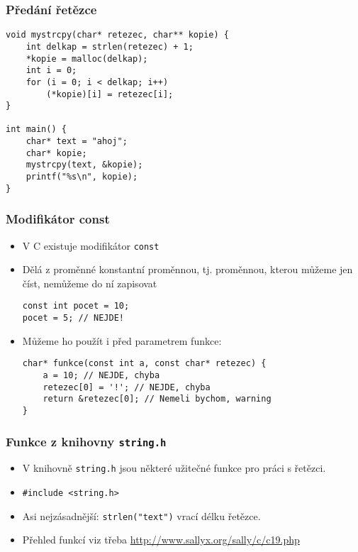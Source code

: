 \documentclass{beamer}
\newenvironment{itemizex}%
  {\large \begin{itemize}%
    \setlength{\itemsep}{8pt}%
    \setlength{\parskip}{8pt}}%
  {\end{itemize}}
\begin{document}
\begin{frame}[t,fragile]\frametitle{Předání řetězce} 
    \begin{verbatim} 
void mystrcpy(char* retezec, char** kopie) {
    int delkap = strlen(retezec) + 1;
    *kopie = malloc(delkap);
    int i = 0;
    for (i = 0; i < delkap; i++)
        (*kopie)[i] = retezec[i];
}

int main() {
    char* text = "ahoj";
    char* kopie;
    mystrcpy(text, &kopie);
    printf("%s\n", kopie);
}
    \end{verbatim}
\end{frame}


\begin{frame}[t,fragile]\frametitle{Modifikátor const} 
    \begin{itemizex}
        \item V C existuje modifikátor \texttt{const}
        \item Dělá z proměnné konstantní proměnnou, tj. proměnnou, kterou můžeme jen číst, nemůžeme do ní zapisovat
        \begin{verbatim} 
const int pocet = 10;
pocet = 5; // NEJDE!
        \end{verbatim}
        \item Můžeme ho použít i před parametrem funkce:
        \begin{verbatim} 
char* funkce(const int a, const char* retezec) {
    a = 10; // NEJDE, chyba
    retezec[0] = '!'; // NEJDE, chyba
    return &retezec[0]; // Nemeli bychom, warning
}
        \end{verbatim}
    \end{itemizex}
\end{frame}


\begin{frame}[t,fragile]\frametitle{Funkce z knihovny \texttt{string.h}} 
    \begin{itemizex}
        \item V knihovně \texttt{string.h} jsou některé užitečné funkce pro práci s řetězci.
        \item \texttt{\#include <string.h>}
        \item Asi nejzásadnější: \texttt{strlen("text")} vrací délku řetězce. 
        \item Přehled funkcí viz třeba \url{http://www.sallyx.org/sally/c/c19.php}
    \end{itemizex}
\end{frame}
\end{document}
